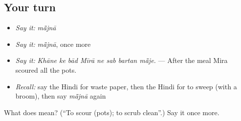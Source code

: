 \subsection*{Your turn}
\begin{itemize}
\raggedright
  \item \emph{Say it:} \emph{mā̃jnā}
  \item \emph{Say it:} \emph{mā̃jnā}, once more
  \item \emph{Say it:} \emph{Khāne ke bād Mīrā ne sab bartan mā̃je.} — After the meal Mira scoured all the pots.
  \item \emph{Recall:} say the Hindi for waste paper, then the Hindi for to sweep (with a broom), then say \emph{mā̃jnā} again
\end{itemize}

\begin{tcolorbox}[breakable,colback=teal!4,colframe=teal!35!black,title={Before you move on}]
What does  mean? (\textquotedblleft{}To scour (pots); to scrub clean\textquotedblright{}.) Say it once more.
\end{tcolorbox}
